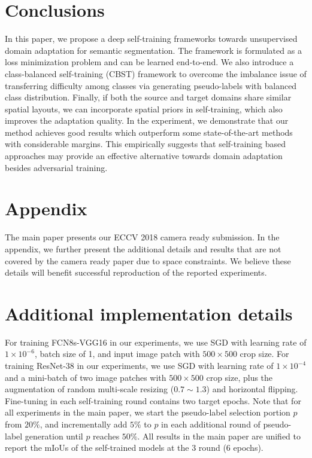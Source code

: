 \documentclass[runningheads]{llncs}
\begin{document}
\section{Conclusions}
In this paper, we propose a deep self-training frameworks towards unsupervised domain adaptation for semantic segmentation. The framework is formulated as a loss minimization problem and can be learned end-to-end. We also introduce a class-balanced self-training (CBST) framework to overcome the imbalance issue of transferring difficulty among classes via generating pseudo-labels with balanced class distribution. Finally, if both the source and target domains share similar spatial layouts, we can incorporate spatial priors in self-training, which also improves the adaptation quality. In the experiment, we demonstrate that our method achieves good results which outperform some state-of-the-art methods with considerable margins. This empirically suggests that self-training based approaches may provide an effective alternative towards domain adaptation besides adversarial training.

\clearpage





\section*{Appendix}
The main paper presents our ECCV 2018 camera ready submission. In the appendix, we further present the additional details and results that are not covered by the camera ready paper due to space constraints. We believe these details will benefit successful reproduction of the reported experiments.

\setcounter{section}{0}
\renewcommand{\thesection}{\Alph{section}}

\section{Additional implementation details}
For training FCN8s-VGG16 in our experiments, we use SGD with learning rate of $1 \times 10^{-6}$, batch size of 1, and input image patch with $500 \times 500$ crop size. For training ResNet-38 in our experiments, we use SGD with learning rate of $1 \times 10^{-4}$ and a mini-batch of two image patches with $500 \times 500$ crop size, plus the augmentation of random multi-scale resizing ($0.7 \sim 1.3$) and horizontal flipping. Fine-tuning in each self-training round contains two target epochs. Note that for all experiments in the main paper, we start the pseudo-label selection portion $p$ from $20\%$, and incrementally add $5\%$ to $p$ in each additional round of pseudo-label generation until $p$ reaches $50\%$. All results in the main paper are unified to report the mIoUs of the self-trained models at the 3 round (6 epochs). 
\end{document}
